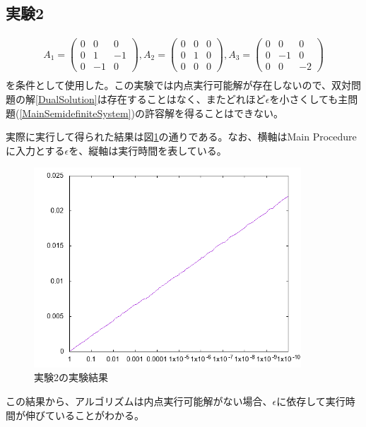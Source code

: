\subsection{実験2}
\begin{align*}
  A_1 = \left(
            \begin{array}{ccc}
              0 &  0 &  0 \\
              0 &  1 & -1 \\
              0 & -1 &  0
            \end{array}
          \right),
  A_2 = \left(
            \begin{array}{ccc}
              0 & 0 & 0 \\
              0 & 1 & 0 \\
              0 & 0 & 0
            \end{array}
          \right),
  A_3 = \left(
            \begin{array}{ccc}
              0 &  0 &  0 \\
              0 & -1 &  0 \\
              0 &  0 & -2
            \end{array}
          \right) \\
\end{align*}
を条件として使用した。この実験では内点実行可能解が存在しないので、双対問題の解\ref{DualSolution}は存在することはなく、またどれほど$\epsilon$を小さくしても主問題(\ref{MainSemidefiniteSystem})の許容解を得ることはできない。

実際に実行して得られた結果は図\ref{test2}の通りである。なお、横軸はMain Procedureに入力とする$\epsilon$を、縦軸は実行時間を表している。
\begin{figure}
  \centering
  \includegraphics[width=10cm]{test2.png}
  \caption{実験2の実験結果}
  \label{test2}
\end{figure}
この結果から、アルゴリズムは内点実行可能解がない場合、$\epsilon$に依存して実行時間が伸びていることがわかる。

